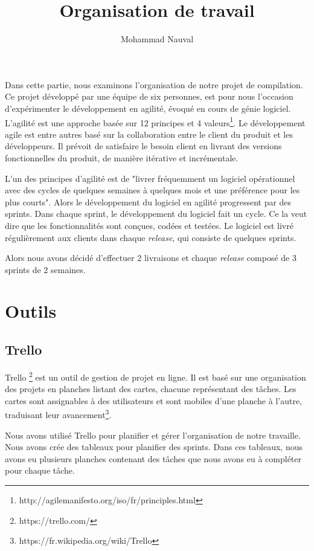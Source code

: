 \documentclass[a4paper,12pt]{article}
\title{Organisation de travail}
\author{Mohammad Nauval}
\begin{document}
\maketitle

Dans cette partie, nous examinons l'organisation de notre projet de compilation. Ce projet développé par une équipe de six personnes, est pour nous l'occasion d'expérimenter le développement en agilité, évoqué en cours de génie logiciel. L'agilité est une approche basée sur 12 principes et 4 valeurs\footnote{http://agilemanifesto.org/iso/fr/principles.html}. Le développement agile est entre autres basé sur la collaboration entre le client du produit et les développeurs. Il prévoit de satisfaire le besoin client en livrant des versions fonctionnelles du produit, de manière itérative et incrémentale. 

L'un des principes d'agilité est de "livrer fréquemment un logiciel opérationnel avec des
cycles de quelques semaines à quelques mois et une préférence pour les plus courts". Alors le développement du logiciel en agilité progressent par des sprints. Dans chaque sprint, le développement du logiciel fait un cycle. Ce la veut dire que les fonctionnalités sont conçues, codées et testées. Le logiciel est livré régulièrement aux clients dans chaque \textit{release}, qui consiste de quelques sprints. 

Alors nous avons décidé d'effectuer 2 livraisons et chaque \textit{release} composé de 3 sprints de 2 semaines.   


\section{Outils}
\subsection{Trello}
Trello \footnote{https://trello.com/} est un outil de gestion de projet en ligne. Il est basé sur une organisation des projets en planches listant des cartes, chacune représentant des tâches. Les cartes sont assignables à des utilisateurs et sont mobiles d'une planche à l'autre, traduisant leur avancement\footnote{https://fr.wikipedia.org/wiki/Trello}. 

Nous avons utilisé Trello pour planifier et gérer l'organisation de notre travaille. Nous avons crée des tableaux pour planifier des sprints. Dans ces tableaux, nous avons eu plusieurs planches contenant des tâches que nous avons eu à compléter pour chaque tâche.
\end{document}
